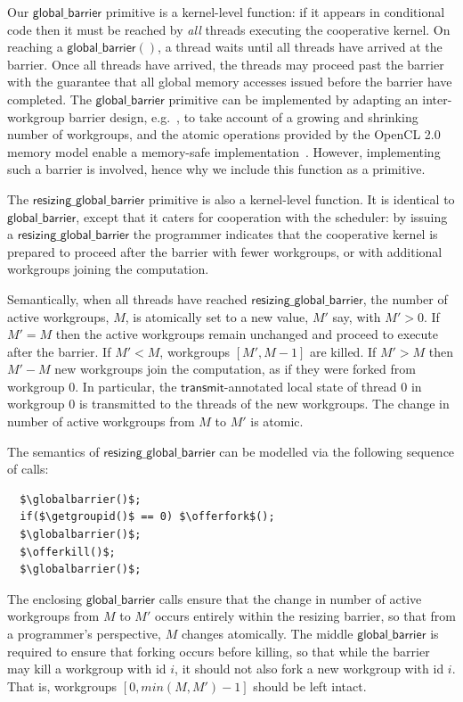 \documentclass[numbers,nocopyrightspace,10pt]{sigplanconf}
\newcommand{\transmit}{\mathsf{transmit}}
\newcommand{\offerfork}{\mathsf{offer\_fork}}
\newcommand{\offerkill}{\mathsf{offer\_kill}}
\newcommand{\globalbarrier}{\mathsf{global\_barrier}}
\newcommand{\resizingglobalbarrier}{\mathsf{resizing\_global\_barrier}}
\newcommand{\getgroupid}{\mathsf{get\_group\_id}}
\begin{document}
Our $\globalbarrier$ primitive is a kernel-level function: if it
appears in conditional code then it must be reached by \emph{all}
threads executing the cooperative kernel.  On reaching a
$\globalbarrier()$, a thread waits until all threads have arrived at
the barrier.  Once all threads have arrived, the threads may proceed
past the barrier with the guarantee that all global memory accesses
issued before the barrier have completed.  The $\globalbarrier$
primitive can be implemented by adapting an inter-workgroup barrier
design, e.g.~\cite{XF10}, to take account of a growing and shrinking number of workgroups, and the atomic operations provided by
the OpenCL 2.0 memory model enable a memory-safe
implementation~\cite{DBLP:conf/oopsla/SorensenDBGR16}.  However, implementing such a barrier is
involved, hence why we include this function as a primitive.

The $\resizingglobalbarrier$ primitive is also a kernel-level
function.  It is identical to $\globalbarrier$, except that it caters
for cooperation with the scheduler: by issuing a
$\resizingglobalbarrier$ the programmer indicates that the cooperative
kernel is prepared to proceed after the barrier with fewer workgroups,
or with additional workgroups joining the computation.

Semantically, when all threads have reached $\resizingglobalbarrier$,
the number of active workgroups, $M$, is atomically set to a new value, $M'$ say, with $M' > 0$.
If $M' = M$ then the active workgroups remain unchanged and proceed to
execute after the barrier.  If $M' < M$, workgroups $[M', M-1]$ are
killed.  If $M' > M$ then $M'-M$ new workgroups join the computation,
as if they were forked from workgroup 0.  In particular, the
$\transmit$-annotated local state of thread 0 in workgroup 0 is
transmitted to the threads of the new workgroups.  The change in
number of active workgroups from $M$ to $M'$ is atomic.

The semantics of $\resizingglobalbarrier$ can be modelled via the following sequence of calls:

\lstset{basicstyle=\tt,numbers=none}
\begin{lstlisting}
  $\globalbarrier()$;
  if($\getgroupid()$ == 0) $\offerfork$();
  $\globalbarrier()$;
  $\offerkill()$;
  $\globalbarrier()$;
\end{lstlisting}
\lstset{basicstyle=\scriptsize\tt,numbers=left}

The enclosing $\globalbarrier$ calls ensure that the change in number
of active workgroups from $M$ to $M'$ occurs entirely within the
resizing barrier, so that from a programmer's perspective, $M$ changes atomically.  The middle $\globalbarrier$ is required to ensure that forking occurs before killing, so that while the barrier may kill a workgroup with id $i$, it should not also fork a new workgroup with id $i$.  That is, workgroups $[0, \mathit{min}(M, M') - 1]$ should be left intact.
\end{document}
